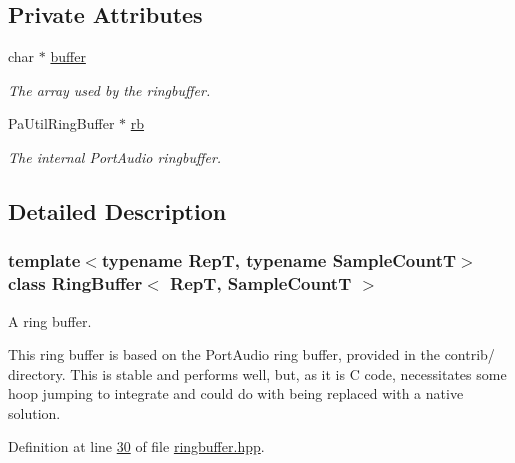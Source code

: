 \subsection*{Private Attributes}
\begin{DoxyCompactItemize}
\item 
\hypertarget{classRingBuffer_a09103853af3302b27d2bbd46f1dfbe87}{char $\ast$ \hyperlink{classRingBuffer_a09103853af3302b27d2bbd46f1dfbe87}{buffer}}\label{classRingBuffer_a09103853af3302b27d2bbd46f1dfbe87}

\begin{DoxyCompactList}\small\item\em The array used by the ringbuffer. \end{DoxyCompactList}\item 
\hypertarget{classRingBuffer_a10985ec171bcc15c1301dc74fcb6e7b2}{Pa\+Util\+Ring\+Buffer $\ast$ \hyperlink{classRingBuffer_a10985ec171bcc15c1301dc74fcb6e7b2}{rb}}\label{classRingBuffer_a10985ec171bcc15c1301dc74fcb6e7b2}

\begin{DoxyCompactList}\small\item\em The internal Port\+Audio ringbuffer. \end{DoxyCompactList}\end{DoxyCompactItemize}


\subsection{Detailed Description}
\subsubsection*{template$<$typename Rep\+T, typename Sample\+Count\+T$>$class Ring\+Buffer$<$ Rep\+T, Sample\+Count\+T $>$}

A ring buffer. 

This ring buffer is based on the Port\+Audio ring buffer, provided in the contrib/ directory. This is stable and performs well, but, as it is C code, necessitates some hoop jumping to integrate and could do with being replaced with a native solution. 

Definition at line \hyperlink{ringbuffer_8hpp_source_l00030}{30} of file \hyperlink{ringbuffer_8hpp_source}{ringbuffer.\+hpp}.



